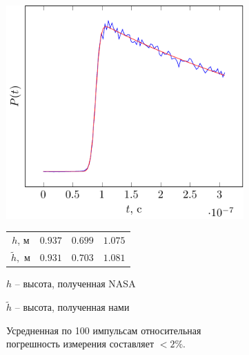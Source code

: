 \documentclass[10pt,pdf,hyperref={unicode}, dvipsnames]{beamer}
\begin{document}
\begin{frame}
\begin{figure}[ht]
\begin{subfigure}{0.42\linewidth}
    \end{subfigure}
    \hfill
    \begin{subfigure}{0.42\linewidth}
        \centering
        \includegraphics[width=\linewidth, page=3]{fig/retracking/real}
    \end{subfigure}
    \hfill
    \begin{subfigure}{0.42\linewidth}
        \centering
        \begin{tabular}{|c|c|c|c|}
            \hline
            $h$, м      & $0.937 $ & $0.699$ & $1.075$ \\
            $\tilde h,$ м & $0.931$ & $0.703$ & $1.081$ \\
            \hline
        \end{tabular}

        \vspace{\baselineskip}

        $h$ -- высота, полученная NASA

        $\tilde h$ -- высота, полученная нами

    Усредненная по 100 импульсам относительная погрешность измерения
    составляет $<2\%$.
    \end{subfigure}

\end{figure}
\end{frame}
\end{document}
